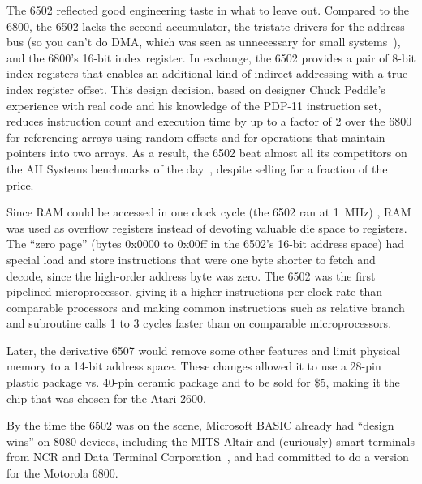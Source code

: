    \begin{geeknote}
The 6502 reflected good engineering taste in what to leave out.
Compared to the 6800, the 6502 lacks the second accumulator, the
tristate drivers for the address bus (so you can't do DMA, which was seen as
unnecessary for small systems~\cite{byte75:6502}), 
and the 6800's 16-bit index register.  In exchange, the 6502 provides a pair
of 8-bit index registers that enables an additional kind of
indirect addressing with a true index register offset.
This design decision, based on designer Chuck Peddle's experience with real
code and his knowledge of the PDP-11 instruction set, 
reduces instruction count and execution time by up to a
factor of 2 over the 6800 for referencing arrays using random
offsets and for operations that
maintain pointers into two arrays.
As a result, the 6502
beat almost all its competitors on  the AH Systems benchmarks of
the day~\cite{edn75:6502}, despite selling for a fraction of the price.

Since RAM could be accessed in one
clock cycle (the 6502 ran at
1~MHz) , RAM was used as overflow registers instead of devoting valuable die
space to registers.  The ``zero
page'' (bytes 0x0000 to 0x00ff in the 6502's 16-bit address space) had
special load and store instructions that were one byte shorter to fetch and
decode, since the high-order address byte was zero.
The 6502 was the first pipelined
microprocessor, giving it a higher instructions-per-clock 
rate than comparable processors and making
common instructions such as relative
branch and subroutine calls 1 to 3 cycles faster than
on comparable microprocessors.  

Later, the derivative 6507 would
remove some other features and limit
physical memory to a 14-bit address space.  These changes allowed it to
use a 28-pin 
plastic package vs. 40-pin ceramic package and to be sold for \$5,
making it the chip that was chosen for the Atari 2600.
    \end{geeknote}

By the time the 6502 was on the scene, Microsoft BASIC already had
``design wins'' on 8080 devices, including the MITS Altair and
(curiously) smart terminals from NCR and Data Terminal
Corporation~\cite[p. 96]{gates}, and had committed to do a version for
the Motorola 6800.  

